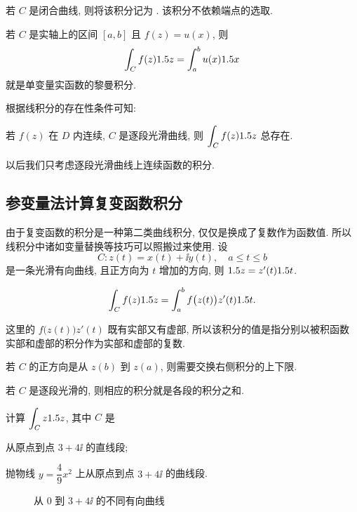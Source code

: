 若 $C$ 是闭合曲线, 则将该积分记为 .
该积分不依赖端点的选取.

若 $C$ 是实轴上的区间 $[a,b]$ 且 $f(z)=u(x)$, 则
\[
  \int_C f(z)1.5 z=\int_a^b u(x)1.5 x
\]
就是单变量实函数的黎曼积分.

根据线积分的存在性条件可知:
\begin{theorem}
  若 $f(z)$ 在 $D$ 内连续, $C$ 是逐段光滑曲线, 则 $\displaystyle\int_C f(z)1.5 z$ 总存在.
\end{theorem}

以后我们\alert{只考虑逐段光滑曲线上连续函数的积分}.


\subsection{参变量法计算复变函数积分}

由于复变函数的积分是一种第二类曲线积分, 仅仅是换成了复数作为函数值.
所以线积分中诸如变量替换等技巧可以照搬过来使用. 设
\[
  C:z(t)=x(t)+\ii y(t),\quad a\le t\le b
\]
是一条光滑有向曲线, 且正方向为 $t$ 增加的方向, 则 $1.5 z=z'(t)1.5 t$.

\begin{theorem}
  \[
    \int_C f(z)1.5 z=\int_a^b f\bigl(z(t)\bigr)z'(t)1.5 t.
  \]
\end{theorem}

这里的 $f\bigl(z(t)\bigr)z'(t)$ 既有实部又有虚部, 所以该积分的值是指分别以被积函数实部和虚部的积分作为实部和虚部的复数.

若 $C$ 的正方向是从 $z(b)$ 到 $z(a)$, 则需要交换右侧积分的上下限.

若 $C$ 是逐段光滑的, 则相应的积分就是各段的积分之和.

\begin{example}
  \label{exam:integral-z}
  计算 $\displaystyle\int_Cz1.5 z$, 其中 $C$ 是
  \begin{subexample}
    \item 从原点到点 $3+4\ii$ 的直线段;
    \item 抛物线 $y=\dfrac49x^2$ 上从原点到点 $3+4\ii$ 的曲线段.
  \end{subexample}
\end{example}

\begin{figure}[H]
  \centering
  \caption{从 $0$ 到 $3+4\ii$ 的不同有向曲线}
\end{figure}

